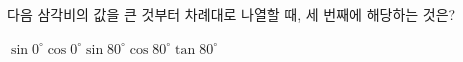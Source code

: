 다음 삼각비의 값을 큰 것부터 차례대로 나열할 때, 세 번째에 해당하는 것은?
\begin{choices32}{$\sin 0^\circ$}{$\cos 0^\circ$}{$\sin 80^\circ$}{$\cos 80^\circ$}{$\tan 80^\circ$}\end{choices32}
